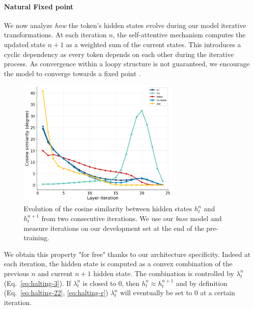 
\paragraph{Natural Fixed point} We now analyze \textit{how} the token's hidden states evolve during our model iterative transformations. At each iteration $n$, the self-attentive mechanism \parencite{vaswani_17} computes the updated state $n+1$ as a weighted sum of the current states. This introduces a cyclic dependency as every token depends on each other during the iterative process. As convergence within a loopy structure is not guaranteed, we encourage the model to converge towards a fixed point \parencite{bai_19}.

\begin{figure}[!htb]
\begin{center}
\includegraphics[width=8cm]{images/cosine-base-v3 (1).png}
\end{center}
\caption{Evolution of the cosine similarity between hidden states $h^n_t$ and $h^{n+1}_t$ from two consecutive iterations. We use our \textit{base} model and measure iterations on our development set at the end of the pre-training.}
\end{figure}

We obtain this property "for free" thanks to our architecture specificity. Indeed at each iteration, the hidden state is computed as a convex combination of the previous $n$ and current $n+1$ hidden state. The combination is controlled by $\lambda^n_t$  (Eq.~\ref{eq:halting-3}). If $\lambda^n_t$ is closed to $0$, then $h^n_t \approx h^{n+1}_t$ and by definition (Eq.~\ref{eq:halting-22}, \ref{eq:halting-r}) $\lambda^n_t$ will eventually be set to $0$ at a certain iteration.

